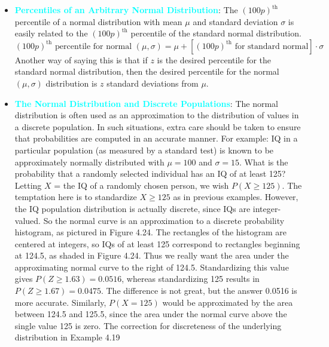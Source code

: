 \documentclass{report}
\begin{document}
\begin{itemize}
\[        \]
    \item \textbf{\textcolor{cyan}{Percentiles of an Arbitrary Normal Distribution}}:
        The \((100p)^{\text{th}}\) percentile of a normal distribution with mean \(\mu\) and standard deviation \(\sigma\) is easily related to the \((100p)^{\text{th}}\) percentile of the standard normal distribution.
        \[
            (100p)^{\text{th}} \text{ percentile for normal } (\mu, \sigma) = \mu + \left[ (100p)^{\text{th}} \text{ for standard normal} \right] \cdot \sigma
        \]
        Another way of saying this is that if \(z\) is the desired percentile for the standard normal distribution, then the desired percentile for the normal \((\mu, \sigma)\) distribution is \(z\) standard deviations from \(\mu\).

    \item \textbf{\textcolor{cyan}{The Normal Distribution and Discrete Populations}}:
        The normal distribution is often used as an approximation to the distribution of values in a discrete population. In such situations, extra care should be taken to ensure that probabilities are computed in an accurate manner.
        \bigbreak \noindent 
        For example:
        \bigbreak \noindent 
        IQ in a particular population (as measured by a standard test) is known to be approximately normally distributed with \( \mu = 100 \) and \( \sigma = 15 \). What is the probability that a randomly selected individual has an IQ of at least 125? Letting \( X \) = the IQ of a randomly chosen person, we wish \( P(X \geq 125) \). The temptation here is to standardize \( X \geq 125 \) as in previous examples. However, the IQ population distribution is actually discrete, since IQs are integer-valued. So the normal curve is an approximation to a discrete probability histogram, as pictured in Figure 4.24.
        \bigbreak \noindent 
        The rectangles of the histogram are centered at integers, so IQs of at least 125 correspond to rectangles beginning at 124.5, as shaded in Figure 4.24. Thus we really want the area under the approximating normal curve to the right of 124.5. Standardizing this value gives \( P(Z \geq 1.63) = 0.0516 \), whereas standardizing 125 results in \( P(Z \geq 1.67) = 0.0475 \). The difference is not great, but the answer 0.0516 is more accurate. Similarly, \( P(X = 125) \) would be approximated by the area between 124.5 and 125.5, since the area under the normal curve above the single value 125 is zero.
        \bigbreak \noindent 
        \bigbreak \noindent The correction for discreteness of the underlying distribution in Example 4.19

\end{itemize}
\end{document}
